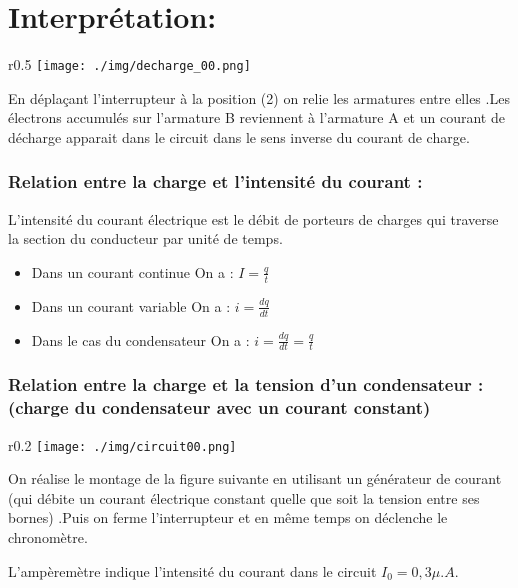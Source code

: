 \documentclass[12pt]{article}
\begin{document}
\section*{Interprétation: }

\begin{wrapfigure}{r}{0.5\textwidth}
	\texttt{[image: ./img/decharge\_00.png]}
\end{wrapfigure}

En déplaçant l'interrupteur à la position (2) on relie les armatures entre elles .Les électrons accumulés sur l'armature B reviennent à
l'armature A et un courant de décharge apparait dans le circuit dans le sens inverse du courant de charge.

\subsubsection{Relation entre la charge et l'intensité du courant : }

L'intensité du courant électrique est le débit de porteurs de charges qui traverse la section du conducteur par unité de temps.

\begin{itemize}
	\item Dans un courant continue On a : $I=\frac{q}{t}$
	\item Dans un courant variable On a : $i=\frac{dq}{dt}$
	\item Dans le cas du condensateur  On a : $i=\frac{dq}{dt} = \frac{q}{t}$
\end{itemize}


\subsubsection{Relation entre la charge et la tension d'un condensateur : (charge du condensateur avec un courant constant) }

\begin{wrapfigure}{r}{0.2\textwidth}
	\texttt{[image: ./img/circuit00.png]}
\end{wrapfigure}


On réalise le montage de la figure suivante en utilisant un générateur de courant (qui débite un courant électrique constant quelle
que soit la tension entre ses bornes) .Puis on ferme l'interrupteur et en même temps on déclenche le chronomètre.

L'ampèremètre indique l'intensité du courant dans le circuit $I_0=0,3\mu.A$. 
\end{document}
